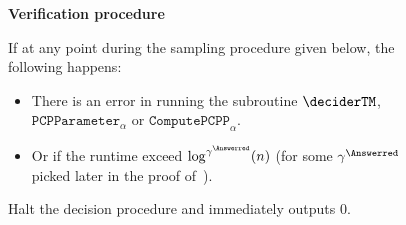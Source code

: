 \begin{figure}[!htbp]
	\centering
	\small
		\begin{gamespec}

			\begin{center}
				\textbf{Verification procedure}
			\end{center}
			If at any point during the sampling procedure given below, the following happens:
		\begin{itemize}
			\item There is an error in running the subroutine $\deciderTM$, $\mathtt{PCPParameter}_{\alpha}$ or $\mathtt{ComputePCPP}_{\alpha}$.
			\item Or if the runtime exceed $\log^{\gamma^{\Answerred}}(n)$ (for some $\gamma^{\Answerred}$ picked later in the proof of~). 
		\end{itemize}
		Halt the decision procedure and immediately outputs $0$. 
		

\end{gamespec}
\end{figure}
